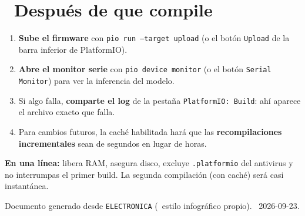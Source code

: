 \documentclass[11pt,a4paper]{article}
\newcommand{\iconotexto}[2]{\textcolor{cyanNeon}{\faIcon{#1}}~#2}
\begin{document}
\section{\iconotexto{flag-checkered}{Después de que compile}}

\begin{enumerate}[leftmargin=1.8em, itemsep=4pt]
  \item \textbf{Sube el firmware} con \texttt{pio run --target upload} (o el botón \texttt{Upload} de la barra inferior de PlatformIO).
  \item \textbf{Abre el monitor serie} con \texttt{pio device monitor} (o el botón \texttt{Serial Monitor}) para ver la inferencia del modelo.
  \item Si algo falla, \textbf{comparte el log} de la pestaña \texttt{PlatformIO: Build}: ahí aparece el archivo exacto que falla.
  \item Para cambios futuros, la caché habilitada hará que las \textbf{recompilaciones incrementales} sean de segundos en lugar de horas.
\end{enumerate}

\vspace{10pt}
\begin{tcolorbox}[cajaConcepto]
\textbf{En una línea:} libera RAM, asegura disco, excluye \texttt{.platformio} del antivirus y no interrumpas el primer build.
La segunda compilación (con caché) será casi instantánea.
\end{tcolorbox}

\vspace{12pt}
\begin{center}
\footnotesize\color{grisTexto}
Documento generado desde \texttt{ELECTRONICA} (\textbullet\ estilo infográfico propio). \textbullet\ 2026-09-23.
\end{center}
\end{document}
